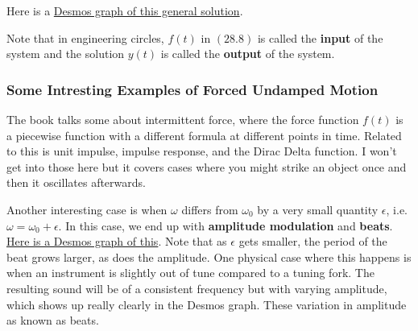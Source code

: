 \documentclass{article}
\begin{document}
Here is a \href{https://www.desmos.com/calculator/6a4rofhsfe}{Desmos graph of this general solution}.

Note that in engineering circles, $f(t)$ in $(28.8)$ is called the \textbf{input} of the system and the solution $y(t)$ is called the \textbf{output} of the system.

\subsubsection{Some Intresting Examples of Forced Undamped Motion}

The book talks some about intermittent force, where the force function $f(t)$ is a piecewise function with a different formula at different points in time. Related to this is unit impulse, impulse response, and the Dirac Delta function. I won't get into those here but it covers cases where you might strike an object once and then it oscillates afterwards.

Another interesting case is when $\omega$ differs from $\omega_0$ by a very small quantity $\epsilon$, i.e. $\omega = \omega_0 + \epsilon$. In this case, we end up with \textbf{amplitude modulation} and \textbf{beats}. \href{https://www.desmos.com/calculator/ihbq1d4aef}{Here is a Desmos graph of this}. Note that as $\epsilon$ gets smaller, the period of the beat grows larger, as does the amplitude. One physical case where this happens is when an instrument is slightly out of tune compared to a tuning fork. The resulting sound will be of a consistent frequency but with varying amplitude, which shows up really clearly in the Desmos graph. These variation in amplitude as known as beats.
\end{document}
